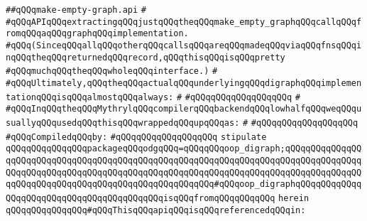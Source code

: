 \label{src/lib/graph/make-empty-graph.api}
\verb|##qQQqmake-empty-graph.api|\newline
\verb|#|\newline
\verb|#qQQqAPIqQQqextractingqQQqjustqQQqtheqQQqmake_empty_graphqQQqcallqQQqfromqQQqaqQQqgraphqQQqimplementation.|\newline
\verb|#qQQq(SinceqQQqallqQQqotherqQQqcallsqQQqareqQQqmadeqQQqviaqQQqfnsqQQqinqQQqtheqQQqreturnedqQQqrecord,qQQqthisqQQqisqQQqpretty|\newline
\verb|#qQQqmuchqQQqtheqQQqwholeqQQqinterface.)|\newline
\verb|#|\newline
\verb|#qQQqUltimately,qQQqtheqQQqactualqQQqunderlyingqQQqdigraphqQQqimplementationqQQqisqQQqalmostqQQqalways:|\newline
\verb|#|\newline
\verb|#qQQqqQQqqQQqqQQqqQQq|\newline
\verb|#|\newline
\verb|#qQQqInqQQqtheqQQqMythrylqQQqcompilerqQQqbackendqQQqlowhalfqQQqweqQQqusuallyqQQqusedqQQqthisqQQqwrappedqQQqupqQQqas:|\newline
\verb|#|\newline
\verb|#qQQqqQQqqQQqqQQqqQQq|\newline
\newline
\verb|#qQQqCompiledqQQqby:|\newline
\verb|#qQQqqQQqqQQqqQQqqQQq|\newline
\newline
\verb|stipulate|\newline
\verb|qQQqqQQqqQQqqQQqpackageqQQqodgqQQq=qQQqqQQqoop_digraph;qQQqqQQqqQQqqQQqqQQqqQQqqQQqqQQqqQQqqQQqqQQqqQQqqQQqqQQqqQQqqQQqqQQqqQQqqQQqqQQqqQQqqQQqqQQqqQQqqQQqqQQqqQQqqQQqqQQqqQQqqQQqqQQqqQQqqQQqqQQqqQQqqQQqqQQqqQQqqQQqqQQqqQQqqQQqqQQqqQQqqQQqqQQqqQQqqQQq#qQQqoop_digraphqQQqqQQqqQQqqQQqqQQqqQQqqQQqqQQqqQQqqQQqqQQqisqQQqfromqQQqqQQqqQQq|\newline
\verb|herein|\newline
\newline
\verb|qQQqqQQqqQQqqQQq#qQQqThisqQQqapiqQQqisqQQqreferencedqQQqin:|\newline
